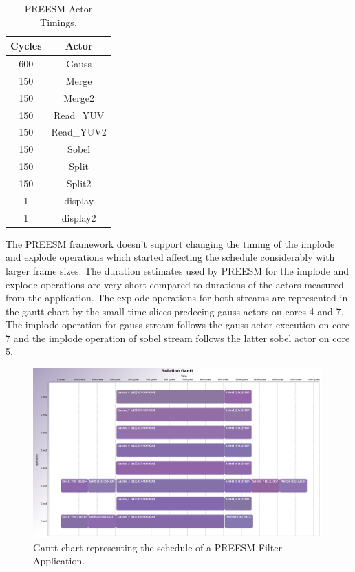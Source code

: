 \begin{table}
    \begin{center}
        \begin{tabular}{| c | c |}

            \hline
            Cycles & Actor \\ \hline
            600 & Gauss \\ \hline
            150 & Merge \\ \hline
            150 & Merge2 \\ \hline
            150 & Read\_YUV \\ \hline
            150 & Read\_YUV2 \\ \hline
            150 & Sobel \\ \hline
            150 & Split \\ \hline
            150 & Split2 \\ \hline
            1 & display \\ \hline
            1 & display2 \\ \hline
        \end{tabular}
        \caption{PREESM Actor Timings.}
        \label{tab:preesm_times}
    \end{center}
\end{table}

The PREESM framework doesn't support changing the timing of the implode and
explode operations which started affecting the schedule considerably with larger
frame sizes. The duration estimates used by PREESM for the implode and explode
operations are very short compared to durations of the actors measured from the
application. The explode operations for both streams are represented in the
gantt chart by the small time slices predecing gauss actors on cores 4 and 7.
The implode operation for gauss stream follows the gauss actor execution on core
7 and the implode operation of sobel stream follows the latter sobel actor on
core 5.

\begin{figure}[h!]
    \begin{center}
        \includegraphics[width=0.99\textwidth]{images/gantt_preesm_cifcif.png}
        \caption{Gantt chart representing the schedule of a PREESM Filter
        Application.}
        \label{fig:preesm_gantt}
    \end{center}
\end{figure}

